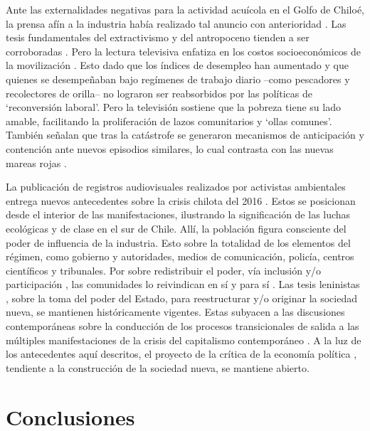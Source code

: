 \documentclass{textolivre}
\begin{document}
Ante las externalidades negativas para la actividad acuícola en el Golfo de Chiloé,
la prensa afín a la industria había realizado tal anuncio con anterioridad \cite{gonzalez2016,infante2016,salmonexpert}.
Las tesis fundamentales del
extractivismo y del antropoceno tienden a ser corroboradas \cite{Foster2016,Gunderson2019}.
Pero la lectura televisiva enfatiza en los
costos socioeconómicos de la movilización \cite{24horasc}. Esto dado que los índices
de desempleo han aumentado y que quienes se desempeñaban bajo regímenes de
trabajo diario --como pescadores y recolectores de orilla-- no lograron ser reabsorbidos
por las políticas de ‘reconversión laboral’. Pero la televisión sostiene que la pobreza tiene
su lado amable, facilitando la proliferación de lazos comunitarios y ‘ollas comunes’.
También señalan que tras la catástrofe se generaron mecanismos de anticipación y
contención ante nuevos episodios similares, lo cual contrasta con las nuevas mareas rojas
\cite{galaz2016,Kamjunke2017}.

La publicación de registros audiovisuales realizados por activistas ambientales
entrega nuevos antecedentes sobre la crisis chilota del 2016 \cite{quense}. Estos se
posicionan desde el interior de las manifestaciones, ilustrando la significación de las
luchas ecológicas y de clase en el sur de Chile. Allí, la población figura consciente del
poder de influencia de la industria. Esto sobre la totalidad de los elementos del régimen,
como gobierno y autoridades, medios de comunicación, policía, centros científicos y
tribunales. Por sobre redistribuir el poder, vía inclusión y/o participación \cite{Folke2016,Mascareo2018b}, 
las comunidades lo reivindican en sí y para sí \cite{marx2003}. Las tesis leninistas \cite{lenin1997}, sobre la toma del poder del Estado, para
reestructurar y/o originar la sociedad nueva, se mantienen históricamente vigentes. Estas
subyacen a las discusiones contemporáneas sobre la conducción de los procesos
transicionales de salida a las múltiples manifestaciones de la crisis del capitalismo
contemporáneo \cite{arboleda}. A la luz de los antecedentes aquí descritos, el
proyecto de la crítica de la economía política \cite{marx2010}, tendiente a la construcción
de la sociedad nueva, se mantiene abierto.



\section{Conclusiones}\label{sec-conclusiones}
\end{document}
